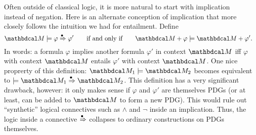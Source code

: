     
\def\entimp{\overset{\smash{\!\!\bullet}}\Rightarrow}
Often outside of classical logic, it is more natural to start with 
    implication instead of negation.
Here is an alternate conception of implication that more closely
    follows the intuition we had for entailment.
Define
\[ \dg M \models \varphi \entimp \varphi' \qquad\text{if and only if}\qquad
    \dg M + \varphi \models \dg M + \varphi'. \] 
In words: a formula $\varphi$ implies another formula $\varphi'$ in context $\dg M$ 
    iff $\varphi$ with context $\dg M$ entails $\varphi'$ with context $\dg M$. 
One nice proprerty of this definition: $\dg M_1 \models \dg M_2$ becomes
    equivalent to $\models \dg M_1 \entimp \dg M_2$.
%
This definition has a very significant drawback, however:
it only makes sense if $\varphi$ and $\varphi'$ are themselves PDGs (or at least,
    can be added to $\dg M$ to form a new PDG). 
This would rule out
    ``synthetic'' logical connectives such as $\land$ and $\lnot$
    inside an implication.
Thus, the logic inside a connective $\entimp$ collapses to ordinary constructions on PDGs themselves.        

